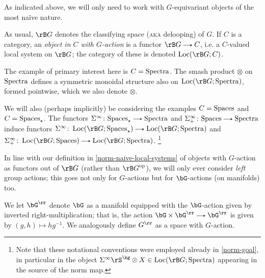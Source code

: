 \begin{nothing}
  \label{norm-naive}
  As indicated above, we will only need to work with $G$-equivariant objects of the most na\"ive nature.

  \begin{subnotation}
    \label{norm-naive-local-systems}
    As usual, $\BG$ denotes the classifying space (\textsc{aka} delooping) of $G$. If $C$ is a category, an \emph{object in $C$ with $G$-action} is a functor $\BG \to C$, i.e. a $C$-valued local system on $\BG$; the category of these is denoted $\Loc(\BG;C)$.

    The example of primary interest here is $C = \mathrm{Spectra}$. The smash product $\otimes$ on $\mathrm{Spectra}$ defines a symmetric monoidal structure also on $\Loc(\BG;\Spectra)$, formed pointwise, which we also denote $\otimes$.

    We will also (perhaps implicitly) be considering the examples $C = \mathrm{Spaces}$ and $C = \mathrm{Spaces}_\star$. The functors $\Sigma^\infty \c \Spaces_\pt \to \Spectra$ and $\Sigma^\infty_+ \c \Spaces \to \Spectra$ induce functors $\Sigma^\infty \c \Loc(\BG;\Spaces_\pt) \to \Loc(\BG;\Spectra)$ and $\Sigma^\infty_+ \c \Loc(\BG;\Spaces) \to \Loc(\BG;\Spectra)$. \footnote{Note that these notational conventions were employed already in \cref{norm-goal}, in particular in the object $\Sigma^\infty \rS^\kg \otimes X \in \Loc(\BG;\Spectra)$ appearing in the source of the norm map.}
  \end{subnotation}

  \begin{subconvention}
    \label{norm-left}
    In line with our definition in \cref{norm-naive-local-systems} of objects with $G$-action as functors out of $\BG$ (rather than $\BG^\op$), we will only ever consider \emph{left} group actions; this goes not only for $G$-actions but for $\bG$-actions (on manifolds) too.

    We let $\bG^\rr$ denote $\bG$ as a manifold equipped with the $\bG$-action given by inverted right-multiplication; that is, the action $\bG \times \bG^\rr \to \bG^\rr$ is given by $(g,h) \mapsto hg^{-1}$. We analogously define $G^\rr$ as a space with $G$-action.
  \end{subconvention}
\end{nothing}

